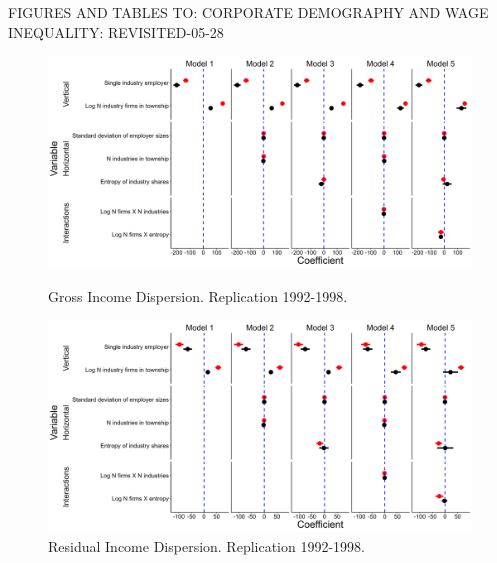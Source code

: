 \documentclass{article}
\begin{document}
\thispagestyle{empty} %

\noindent
FIGURES AND TABLES TO: \newline
CORPORATE DEMOGRAPHY AND WAGE INEQUALITY: REVISITED-05-28

\clearpage %
\thispagestyle{empty} %

\begin{figure}[htbp]
  \centering

\includegraphics[width=1\textwidth]{grossvar_replication_1998_update.png}
\caption{Gross Income Dispersion.  Replication 1992-1998.}
\label{fig:gross_income}
\vspace{1cm} %
  

\includegraphics[width=1\textwidth]{resvar_replication_1998_update.png}
\caption{Residual Income Dispersion.  Replication 1992-1998.}  
\label{fig:residual_income}
\end{figure}


\clearpage %
\thispagestyle{empty} %
\end{document}
